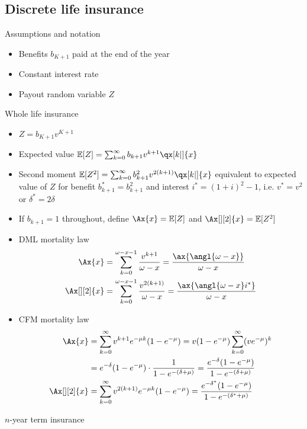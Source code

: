\subsection{Discrete life insurance}

Assumptions and notation
\begin{itemize}
\item Benefits $b_{K + 1}$ paid at the end of the year
\item Constant interest rate
\item Payout random variable $Z$
\end{itemize}

Whole life insurance
\begin{itemize}
\item $Z = b_{K + 1}v^{K + 1}$
\item Expected value $\mathbb{E}[Z] = \sum_{k = 0}^{\infty} b_{k + 1}v^{k + 1}\qx[k|]{x}$
\item Second moment $\mathbb{E}[Z^2] = \sum_{k = 0}^{\infty} b_{k + 1}^2v^{2(k + 1)}\qx[k|]{x}$ equivalent to expected value of $Z$ for benefit $b_{k + 1}^{*} = b_{k + 1}^2$ and interest $i^{*} = (1 + i)^2 - 1$, i.e. $v^{*} = v^2$ or $\delta^{*} = 2\delta$
\item If $b_{k + 1} = 1$ throughout, define $\Ax{x} = \mathbb{E}[Z]$ and $\Ax[][2]{x} = \mathbb{E}[Z^2]$
\item DML mortality law
\begin{align*}
\Ax{x} &= \sum_{k = 0}^{\omega - x - 1}\frac{v^{k + 1}}{\omega - x} = \frac{\ax{\angl{\omega - x}}}{\omega - x} \\
\Ax[][2]{x} &= \sum_{k = 0}^{\omega - x - 1}\frac{v^{2(k + 1)}}{\omega - x} = \frac{\ax{\angl{\omega - x}i^{*}}}{\omega - x}
\end{align*}
\item CFM mortality law
\begin{align*}
\Ax{x} &= \sum_{k = 0}^{\infty} v^{k + 1}e^{-\mu k}(1 - e^{-\mu}) = v(1 - e^{-\mu})\sum_{k = 0}^{\infty} (ve^{-\mu})^k \\
&= e^{-\delta}(1 - e^{-\mu})\cdot\frac{1}{1 - e^{-(\delta + \mu)}} = \frac{e^{-\delta}(1 - e^{-\mu})}{1 - e^{-(\delta + \mu)}} \\
\Ax[][2]{x} &= \sum_{k = 0}^{\infty} v^{2(k + 1)}e^{-\mu k}(1 - e^{-\mu}) = \frac{e^{-\delta^{*}}(1 - e^{-\mu})}{1 - e^{-(\delta^{*} + \mu)}}
\end{align*}
\end{itemize}

$n$-year term insurance